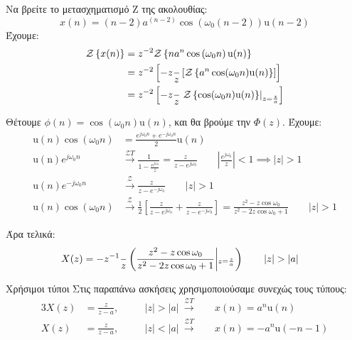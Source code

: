\documentclass[11pt,a4paper,notitlepage,fleqn,draft]{article}
\begin{document}
\begin{exercise}
	Να βρείτε το μετασχηματισμό Z της ακολουθίας:
	\[
	x(n) = (n-2)a^{(n-2)}\cos\left( \omega_0 (n-2) \right)
	\mathrm{u}(n-2)
	\]
	\tcblower
	Έχουμε:
	\begin{align*}
		\mathcal{Z}\left\lbrace x(n) \right\rbrace&= z^{-2}
		\mathcal{Z} \left\lbrace n a^n \cos\left(\omega_0 n\right) \mathrm{u}(n)\right\rbrace
		\\ &= z^{-2} \left[
		-z \frac{}{z} \left[ \mathcal{Z}
		  \left\lbrace a^n\cos(\omega_0 n)\mathrm{u}(n) \right\rbrace
		 \right]
		\right]
		\\ &= z^{-2}\left[
		  -z \frac{}{z}\left.\mathcal{Z}\left\lbrace \cos(\omega_0 n)\mathrm{u}(n) \right\rbrace\right|_{z=\frac{z}{a}}
		\right]
	\end{align*}
	
	Θέτουμε \( \phi(n) = \cos(\omega_0 n)\mathrm{u}(n) \), και θα βρούμε την \( \Phi(z) \). Έχουμε:
	\begin{align*}
		\mathrm{u}(n) \cos(\omega_0 n) &= \frac{e^{j\omega_0 n} + e^{-j\omega_0 n}}{2} \mathrm u(n)
		\\
		\mathrm{u(n)} e^{j\omega_0 n }&\xrightarrow{\mathcal{Z} T} \frac{1}{1-\frac{e^{j\omega_0}}{z}}
		= \frac{z}{z-e^{j\omega_0}} \qquad \left| \frac{e^{j\omega_0}}{z} \right| < 1 \implies |z|>1
		\\
		\mathrm{u}(n) e^{-j\omega_0 n}&\xrightarrow{\mathcal{Z}} \frac{z}{z-e^{-j\omega_0}} \qquad |z|>1
		\\
		\mathrm{u}(n) \cos(\omega_0 n)&\xrightarrow{\mathcal{Z}} \frac{1}{2}\left[
		\frac{z}{z-e^{j\omega_0}} + \frac{z}{z-e^{-j\omega_0}}
		\right]
		= \frac{z^2-z\cos\omega_0}{z^2-2z\cos\omega_0 + 1}\qquad |z|>1
	\end{align*}
	
	Άρα τελικά:
	\begin{align*}
		X(z) &= -z^{-1}\od{}{z} \left(
		\frac{z^2-z\cos\omega_0}{z^2-2z\cos\omega_0+1}\middle|_{z=\frac{z}{a}}
		\right)
		\qquad |z|>|a|
	\end{align*}
\end{exercise}


\begin{infobox}{Χρήσιμοι τύποι}
	Στις παραπάνω ασκήσεις χρησιμοποιούσαμε συνεχώς τους τύπους:
	\begin{alignat*}{3}
		X(z) &= \frac{z}{z-a}, &&\quad |z|>|a|\ \xrightarrow{\mathcal{Z}T}\ && x(n) = a^n\mathrm{u}(n)
		\\
		X(z) &= \frac{z}{z-a}, &&\quad |z|<|a|\ \xrightarrow{\mathcal{Z}T}\ && x(n) = -a^n\mathrm{u}(-n-1)
	\end{alignat*}
\end{infobox}
\end{document}
